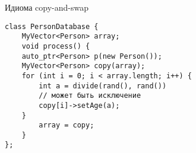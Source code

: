 \begin{description}[itemindent=0.5mm,noitemsep]
	\begin{minipage}{0.35\textwidth}
	    Идиома copy-and-swap
	\end{minipage}
	\hfill
	\begin{minipage}{0.55\textwidth}
	    \begin{verbatim}
class PersonDatabase {
    MyVector<Person> array;
    void process() {
	auto_ptr<Person> p(new Person());
	MyVector<Person> copy(array);
	for (int i = 0; i < array.length; i++) {
	    int a = divide(rand(), rand())
	    // может быть исключение
	    copy[i]->setAge(a);
	}
        array = copy;
    }
};
	    \end{verbatim}
	\end{minipage}
\end{description} 
